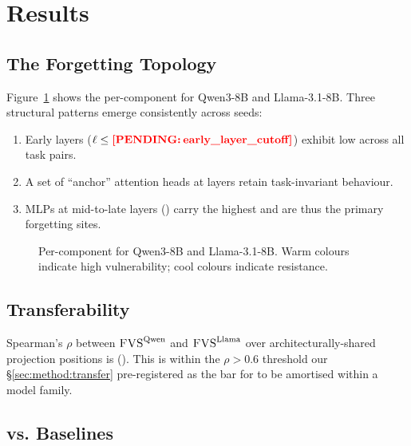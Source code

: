 \section{Results}
\label{sec:results}

\subsection{The Forgetting Topology}
\label{sec:results:topology}

Figure~\ref{fig:topology} shows the per-component \fvs{} for Qwen3-8B and Llama-3.1-8B. Three structural patterns emerge consistently across seeds:
\begin{enumerate}
  \item Early layers ($\ell \le \pend{early_layer_cutoff}$) exhibit low \fvs{} across all task pairs.
  \item A set of ``anchor'' attention heads at layers  retain task-invariant behaviour.
  \item MLPs at mid-to-late layers () carry the highest \fvs{} and are thus the primary forgetting sites.
\end{enumerate}

\begin{figure}[t]
  \centering
  \caption{Per-component \fvs{} for Qwen3-8B and Llama-3.1-8B. Warm colours indicate high vulnerability; cool colours indicate resistance.}
  \label{fig:topology}
\end{figure}

\subsection{\fvs{} Transferability}
\label{sec:results:transfer}

Spearman's $\rho$ between $\textsc{FVS}^{\mathrm{Qwen}}$ and $\textsc{FVS}^{\mathrm{Llama}}$ over architecturally-shared projection positions is  (). This is within the $\rho > 0.6$ threshold our \S\ref{sec:method:transfer} pre-registered as the bar for \fvs{} to be amortised within a model family.

\subsection{\tglora{} vs. Baselines}
\label{sec:results:tglora}

